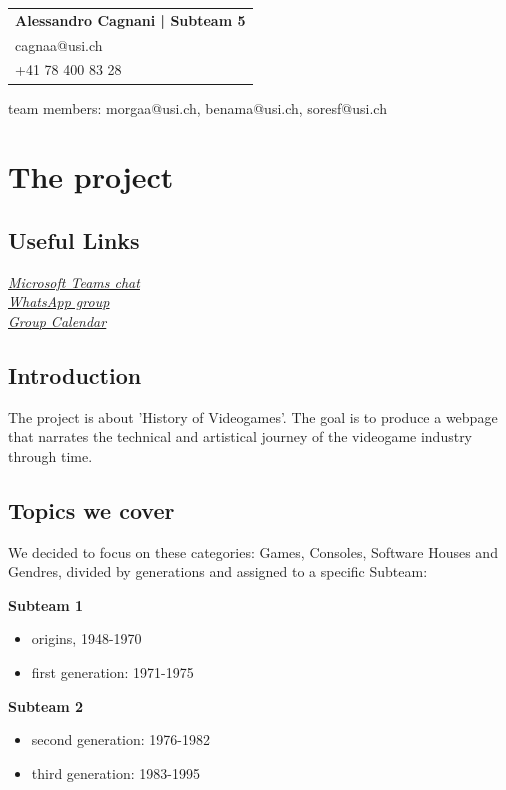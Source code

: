 \documentclass[a4paper,10pt]{article}
\newcommand{\idcard}[3]{
    \vspace{-0.3cm}
    \begin{table}[h!]
     \begin{tabular}{|l|}
        \hline
        \textbf{#1} \\
        #2 \\
        #3\\
        \hline
     \end{tabular}
    \end{table}
    \vspace{-0.3cm}
}
\newcommand{\link}[2]{
    \href{#2}{\textit{\underline{#1}}}\\
}
\begin{document}
        \idcard{Alessandro Cagnani | \textbf{Subteam 5}}{cagnaa@usi.ch}{+41 78 400 83 28}
        team members: morgaa@usi.ch, benama@usi.ch, soresf@usi.ch\newline
\newpage

\section{The project}
    \subsection{Useful Links}
        \link{Microsoft Teams chat}{https://teams.microsoft.com/l/team19\%3aee0d65826e13406983df3773a93b52a2\%40thread.tacv2/conversations?groupId=675cd029-770b-4bdb-bbfc-6ea78473d809&tenantId=95bdc5ac-afb5-4881-801b-3874f365cd6f}
        \link{WhatsApp group}{https://chat.whatsapp.com/Kf9MN7y5BQ6L7svmkolKC9}
        \link{Group Calendar}{https://outlook.office.com/calendar/group/group.university/sa1g1p/view/month}
    \vspace{-0.6cm}
    \subsection{Introduction}
        The project is about 'History of Videogames'. The goal is to produce a webpage that narrates the technical and artistical journey of the videogame industry through time.
    
    
    \subsection{Topics we cover}
    We decided to focus on these categories: Games, Consoles, Software Houses and Gendres, divided by generations and assigned to a specific Subteam:
    
     \textbf{Subteam 1}
     \vspace{-0.3cm}
     \begin{itemize}
     \item origins, 1948-1970
     \vspace{-0.3cm}
     \item first generation: 1971-1975
     \end{itemize}
     
     \textbf{Subteam 2}
     \vspace{-0.3cm}
     \begin{itemize}
     \item second generation: 1976-1982
     \vspace{-0.3cm}
     \item third generation: 1983-1995
     \end{itemize}
     
\end{document}
